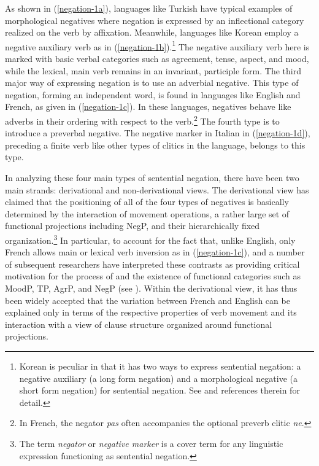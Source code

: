 \documentclass[output=paper
	        ,collection
	        ,collectionchapter
 	        ,biblatex
                ,babelshorthands
                ,newtxmath
                ,draftmode
                ,colorlinks, citecolor=brown
]{langscibook}
\begin{document}
{\noindent
As shown in (\ref{negation-1a}), languages like Turkish
have typical examples of morphological negatives where
negation is expressed by an inflectional category realized on the
verb by affixation. Meanwhile, languages like Korean
 employ a negative auxiliary verb as in (\ref{negation-1b}).\footnote{Korean
 is peculiar in that it has two ways to
 express sentential negation: a negative auxiliary (a long form
 negation)  and a morphological negative (a short form negation)
 for sentential negation. See \citet{Kim:00,Kim:16} and references therein for detail.}
  The negative auxiliary
 verb here is marked with basic verbal categories such as agreement, tense, aspect, and mood, while the lexical, main verb remains in an invariant, participle form. The third major way of expressing negation is to use an adverbial
negative. This type of negation, forming an independent word, is found in
languages like English and French, as given in (\ref{negation-1c}). In these languages, negatives behave like adverbs in their ordering with respect to the verb.\footnote{In French, the negator \emph{pas}
often accompanies the optional preverb clitic \emph{ne}.} The fourth
type is to introduce a preverbal negative. The negative marker in Italian in (\ref{negation-1d}), preceding a finite verb like other types of clitics in the language,
belongs to this type.


In analyzing these four main types of sentential negation, there have been two main strands: derivational and non-derivational views. The derivational view has claimed that the positioning of all of the
four types of negatives is basically determined by the interaction of movement
operations, a rather large set of functional projections including NegP,
and their hierarchically fixed organization.\footnote{The term \textit{negator} or \textit{negative marker} is a cover term for any linguistic expression functioning as sentential negation.}
In particular, to account for the
fact that, unlike English, only French allows main or lexical verb inversion
as in (\ref{negation-1c}), \citet{Pollock:89,Pollock:94} and a number of subsequent researchers
have interpreted these contrasts as providing critical motivation for
the process of  and the existence of functional
categories such as MoodP, TP, AgrP, and NegP (see \citealt{Belletti:90, Zanuttini:97,Chomsky:91,Chomsky:93,Lasnik:95, Haegeman:95,Haegeman:97, Vikner97a-u, Zanuttini:2001, Zeijlstra:15}).
Within the derivational view, it has thus been widely
accepted that the variation between French and English can be explained only in terms of the respective properties of verb movement and its interaction with a view of clause
structure organized around functional projections.


}
\end{document}
